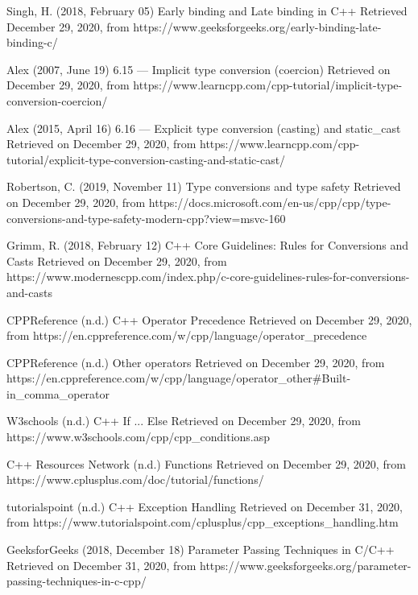 \documentclass[12pt]{article}
\begin{document}
\begin{thebibliography}{50}
Singh, H. (2018, February 05) Early binding and Late binding in C++ Retrieved December 29, 2020, from https://www.geeksforgeeks.org/early-binding-late-binding-c/

Alex (2007, June 19) 6.15 — Implicit type conversion (coercion) Retrieved on December 29, 2020, from https://www.learncpp.com/cpp-tutorial/implicit-type-conversion-coercion/

Alex (2015, April 16) 6.16 — Explicit type conversion (casting) and static\_cast Retrieved on December 29, 2020, from https://www.learncpp.com/cpp-tutorial/explicit-type-conversion-casting-and-static-cast/

Robertson, C. (2019, November 11) Type conversions and type safety Retrieved on December 29, 2020, from https://docs.microsoft.com/en-us/cpp/cpp/type-conversions-and-type-safety-modern-cpp?view=msvc-160

Grimm, R. (2018, February 12) C++ Core Guidelines: Rules for Conversions and Casts Retrieved on December 29, 2020, from https://www.modernescpp.com/index.php/c-core-guidelines-rules-for-conversions-and-casts

CPPReference (n.d.) C++ Operator Precedence Retrieved on December 29, 2020, from https://en.cppreference.com/w/cpp/language/operator\_precedence

CPPReference (n.d.) Other operators Retrieved on December 29, 2020, from https://en.cppreference.com/w/cpp/language/operator\_other\#Built-in\_comma\_operator

W3schools (n.d.) C++ If ... Else Retrieved on December 29, 2020, from https://www.w3schools.com/cpp/cpp\_conditions.asp

C++ Resources Network (n.d.) Functions Retrieved on December 29, 2020, from https://www.cplusplus.com/doc/tutorial/functions/

tutorialspoint (n.d.) C++ Exception Handling Retrieved on December 31, 2020, from https://www.tutorialspoint.com/cplusplus/cpp\_exceptions\_handling.htm

GeeksforGeeks (2018, December 18) Parameter Passing Techniques in C/C++ Retrieved on December 31, 2020, from https://www.geeksforgeeks.org/parameter-passing-techniques-in-c-cpp/


\end{thebibliography}
\end{document}
